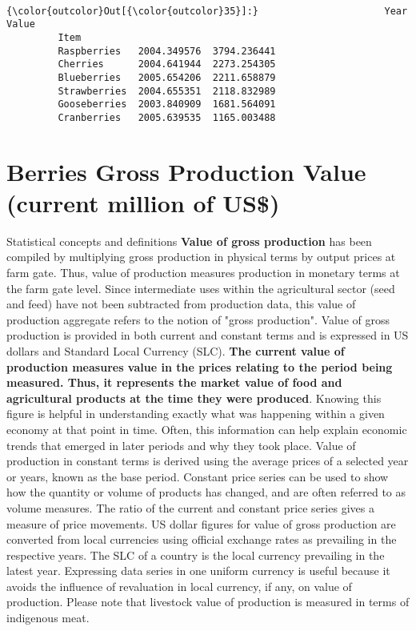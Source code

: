 \documentclass[11pt]{article}
\begin{document}
    \begin{center}
    \end{center}
    { \hspace*{\fill} \\}
    
\begin{Verbatim}[commandchars=\\\{\}]
{\color{outcolor}Out[{\color{outcolor}35}]:}                      Year        Value
         Item                                  
         Raspberries   2004.349576  3794.236441
         Cherries      2004.641944  2273.254305
         Blueberries   2005.654206  2211.658879
         Strawberries  2004.655351  2118.832989
         Gooseberries  2003.840909  1681.564091
         Cranberries   2005.639535  1165.003488
\end{Verbatim}
            
    \section{Berries Gross Production Value (current million of
US\$)}\label{berries-gross-production-value-current-million-of-us}

    Statistical concepts and definitions \textbf{Value of gross production}
has been compiled by multiplying gross production in physical terms by
output prices at farm gate. Thus, value of production measures
production in monetary terms at the farm gate level. Since intermediate
uses within the agricultural sector (seed and feed) have not been
subtracted from production data, this value of production aggregate
refers to the notion of "gross production". Value of gross production is
provided in both current and constant terms and is expressed in US
dollars and Standard Local Currency (SLC). \textbf{The current value of
production measures value in the prices relating to the period being
measured. Thus, it represents the market value of food and agricultural
products at the time they were produced}. Knowing this figure is helpful
in understanding exactly what was happening within a given economy at
that point in time. Often, this information can help explain economic
trends that emerged in later periods and why they took place. Value of
production in constant terms is derived using the average prices of a
selected year or years, known as the base period. Constant price series
can be used to show how the quantity or volume of products has changed,
and are often referred to as volume measures. The ratio of the current
and constant price series gives a measure of price movements. US dollar
figures for value of gross production are converted from local
currencies using official exchange rates as prevailing in the respective
years. The SLC of a country is the local currency prevailing in the
latest year. Expressing data series in one uniform currency is useful
because it avoids the influence of revaluation in local currency, if
any, on value of production. Please note that livestock value of
production is measured in terms of indigenous meat.
\end{document}
